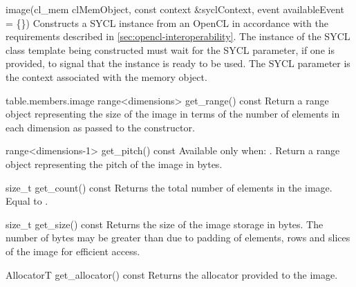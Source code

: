     \addRowThreeSL
      { image(cl_mem clMemObject, }
      { const context \&syclContext, }
      { event availableEvent = \{\}) }
      {   
        Constructs a SYCL  instance from an OpenCL  in accordance with the requirements described in \ref{sec:opencl-interoperability}.
        The instance of the SYCL  class template being constructed must wait for the SYCL  parameter, if one is provided,  to signal that the  instance is ready to be used.
        The SYCL  parameter  is the context associated with the memory object.
      }       
\completeTable


{table.members.image}
  \addRow
    {range<dimensions> get_range() const}
    {
      Return a range object representing the
      size of the image in terms of the number
      of elements in each dimension as passed
      to the constructor.
    }

  \addRow
    {range<dimensions-1> get_pitch() const}
    {
      Available only when: .
      \newline
      Return a range object representing the
      pitch of the image in bytes.
    }

  \addRow
    {size_t get_count() const}
    {
      Returns the total number of elements in the image.
      Equal to .
    }

  \addRow
    {size_t get_size() const}
    {
      Returns the size of the image storage in bytes.  The number of
      bytes may be greater than 
      due to padding of elements, rows and slices of the image for
      efficient access.
    }

  \addRow
    {AllocatorT get_allocator() const}
    {
      Returns the allocator provided to the image.
    }

